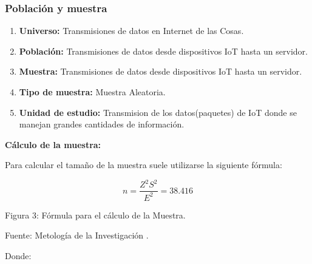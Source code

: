            \subsubsection{Población y muestra}    
                \vskip 0.3cm
                \begin{enumerate}
                    \item[]{{\bf Universo:} Transmisiones de datos en Internet de las Cosas.}
                    \item[]{{\bf Población:} Transmisiones de datos desde dispositivos IoT hasta un servidor.}
                    \item[]{{\bf Muestra:} Transmisiones de datos desde dispositivos IoT hasta un servidor.}
                    \item[]{{\bf Tipo de muestra:} Muestra Aleatoria.}
                    \item[]{{\bf Unidad de estudio:} Transmision de los datos(paquetes) de IoT donde se manejan grandes cantidades de información.}
                \end{enumerate}\par                 
                \vskip 0.3cm

                {\bf Cálculo de la muestra:}\par
                \vskip 0.3cm

                Para calcular el tamaño de la muestra suele utilizarse la siguiente fórmula:\par
                \begin{equation*}\label{}
                    n = \frac{Z^{2}S^{2}}{E^{2}} = 38.416
                \end{equation*}
                \begin{center}
                    { Figura 3: Fórmula para el cálculo de la Muestra.}\par
                    { Fuente: Metología de la Investigación {\cite{sampieri1997}}. }\par
                \end{center} 
                \vskip 0.3cm   

                Donde:
                \vskip 0.3cm


